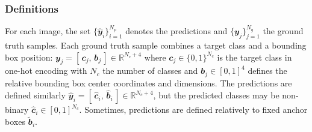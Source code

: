 \subsubsection{Definitions} For each image, the set $\{\hat{\mathbfit{y}}_i \}_{i=1}^{N_p}$ denotes the predictions and $\{\mathbfit{y}_j\}_{j=1}^{N_g}$ the ground truth samples. Each ground truth sample combines a target class and a bounding box position: $\mathbfit{y}_j = \left[\,\mathbfit{c}_j,\, \mathbfit{b}_j\,\right] \in \mathbb{R}^{N_c+4}$ where $\mathbfit{c}_j \in \{0,1\}^{N_c}$ is the target class in one-hot encoding with $N_c$ the number of classes and $\mathbfit{b}_j \in [0,1]^4$ defines the relative bounding box center coordinates and dimensions. The predictions are defined similarly $\hat{\mathbfit{y}}_i = [\,\hat{\mathbfit{c}}_i,\, \hat{\mathbfit{b}}_i\,] \in \mathbb{R}^{N_c+4}$, but the predicted classes may be non-binary $\hat{\mathbfit{c}}_i \in \left[0,1\right]^{N_c}$. Sometimes, predictions are defined relatively to fixed anchor boxes $\tilde{\mathbfit{b}}_i$. %


